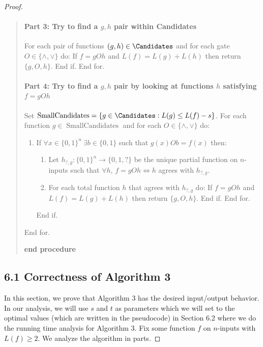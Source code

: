 \begin{proof}
\begin{quote}
\paragraph{Part 3: Try to find a $g,h$ pair within Candidates}
For each pair of functions $(g,h)\in\Candidates$ and for each gate $O\in\{\land,\lor\}$ do: If $f=gOh$ and $L(f)=L(g)+L(h)$ then return $\{g,O,h\}$. End if. End for.
\paragraph{Part 4: Try to find a $g,h$ pair by looking at functions $h$ satisfying $f=gOh$}
Set $\operatorname{SmallCandidates}=\{g\in\Candidates:L(g)\leq L(f)-s\}$. For each function $g\in\operatorname{SmallCandidates}$ and for each $O\in\{\land,\lor\}$ do:
\begin{enumerate}
\item If $\forall x\in\{0,1\}^n\ \exists b\in\{0,1\}$ such that $g(x)Ob=f(x)$ then:
\begin{enumerate}
\item Let $h_{?,g}:\{0,1\}^n\to\{0,1,?\}$ be the unique partial function on $n$-inputs such that $\forall h$, $f=gOh\Longleftrightarrow h$ agrees with $h_{?,g}$.
\item For each total function $h$ that agrees with $h_{?,g}$ do: If $f=gOh$ and $L(f)=L(g)+L(h)$ then return $\{g,O,h\}$. End if. End for.
\end{enumerate}
End if.
\end{enumerate}
End for.\par
\textbf{end procedure}
\end{quote}
\subsection*{6.1 Correctness of Algorithm 3}
In this section, we prove that Algorithm 3 has the desired input/output behavior. In our analysis, we will use $s$ and $t$ as parameters which we will set to the optimal values (which are written in the pseudocode) in Section 6.2 where we do the running time analysis for Algorithm 3.
Fix some function $f$ on $n$-inputs with $L(f)\geq 2$. We analyze the algorithm in parts.

\end{proof}
